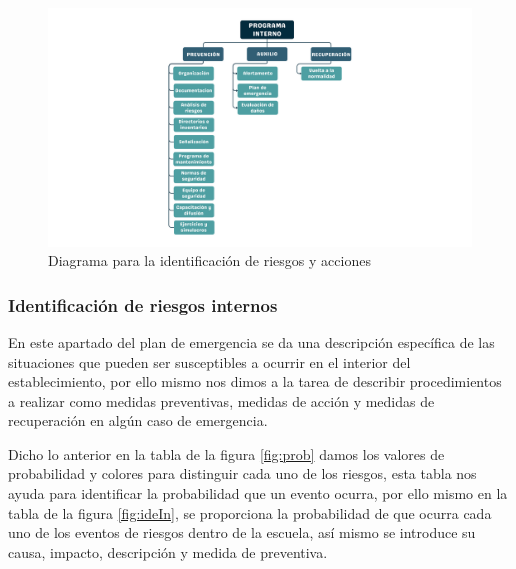     \begin{figure}[H] 
        \centering
        \includegraphics[trim = {140mm 15mm 140mm 15mm},clip,scale=0.35]{22/Img/programaInterno.pdf}
        \caption{Diagrama para la identificación de riesgos y acciones}
        \label{fig:dig}
    \end{figure}
    
    \subsubsection{Identificación de riesgos internos}
    
    En este apartado del plan de emergencia se da una descripción específica de las situaciones que pueden ser susceptibles a ocurrir en el interior del establecimiento, por ello mismo nos dimos a la tarea de describir procedimientos a realizar como medidas preventivas, medidas de acción y medidas de recuperación en algún caso de emergencia.
    
    Dicho lo anterior en la tabla de la figura \ref{fig:prob} damos los valores de probabilidad y colores para distinguir cada uno de los riesgos, esta tabla nos ayuda para identificar la probabilidad que un evento ocurra, por ello mismo en la tabla de la figura \ref{fig:ideIn}, se proporciona la probabilidad de que ocurra cada uno de los eventos de riesgos dentro de la escuela, así mismo se introduce su causa, impacto, descripción y medida de preventiva.
    
